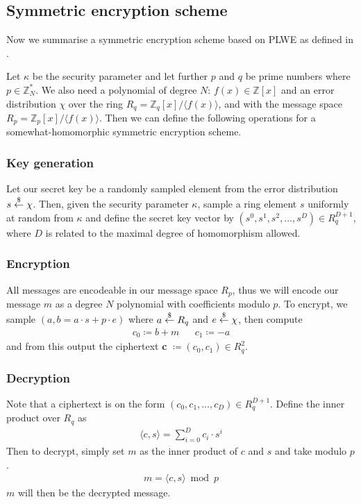 \documentclass[../main.tex]{subfiles}
\begin{document}
\subsection{Symmetric encryption scheme}

Now we summarise a symmetric encryption scheme based on PLWE as defined in \cite{brakerski2011fully}.

Let $\kappa$ be the security parameter and let further $p$ and $q$ be prime numbers where $p \in \mathbb{Z}_N^*$.
We also need a polynomial of degree $N$: $f(x) \in \mathbb{Z}[x]$ and an error distribution $\chi$ over the ring
$R_q = \mathbb{Z}_q[x] / \langle f(x) \rangle$, and with the message space $R_p = \mathbb{Z}_p[x] / \langle f(x) \rangle$.
Then we can define the following operations for a somewhat-homomorphic symmetric encryption scheme.

\subsubsection{Key generation}
Let our secret key be a randomly sampled element from the error distribution $s \overset{\$}{\gets}{} \chi$.
Then, given the security parameter $\kappa$, sample a ring element $s$ uniformly at random from $\kappa$ and define the
secret key vector by $(s^0, s^1, s^2, \dots, s^D) \in R_q^{D+1}$, where $D$ is related to the maximal degree of homomorphism allowed.

\subsubsection{Encryption}
All messages are encodeable in our message space $R_p$, thus we will encode our message $m$ as a degree $N$
polynomial with coefficients modulo $p$.
To encrypt, we sample $(a, b = a \cdot s + p \cdot e)$ where $a \overset{\$}{\gets}{} R_q$ and $e \overset{\$}{\gets}{} \chi$,
then compute
\begin{align*}
    c_0 \coloneqq b + m &  & c_1 \coloneqq -a
\end{align*}
and from this output the ciphertext \textbf{c} $\coloneqq (c_0, c_1) \in R_q^2$.

\subsubsection{Decryption}
Note that a ciphertext is on the form $(c_0, c_1, \dots , c_D) \in R_q^{D+1}$.
Define the inner product over $R_q$ as
\begin{align*}
    \langle c, s \rangle = \sum_{i=0}^D c_i \cdot s^i
\end{align*}
Then to decrypt, simply set $m$ as the inner product of $c$ and $s$ and take modulo $p$.
\begin{align*}
    m = \langle c, s \rangle \bmod p
\end{align*}
$m$ will then be the decrypted message.
\end{document}
